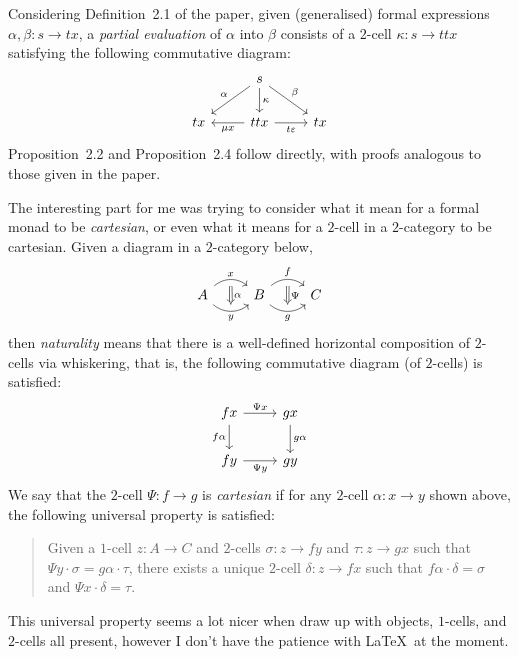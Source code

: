 \documentclass{amsart}
\begin{document}
Considering Definition~2.1 of the paper, given (generalised) formal expressions
$\alpha, \beta \colon s \rightarrow tx$, a \emph{partial evaluation} of
$\alpha$ into $\beta$ consists of a $2$-cell $\kappa \colon s \rightarrow ttx$
satisfying the following commutative diagram:
\begin{equation*}
\begin{tikzcd}
& s
\arrow[ld, "\alpha"']
\arrow[d, "\kappa"]
\arrow[rd, "\beta"]
& \\
tx
& ttx
\arrow[l, "\mu x"]
\arrow[r, "t \varepsilon"']
& tx
\end{tikzcd}
\end{equation*}
Proposition~2.2 and Proposition~2.4 follow directly, with proofs analogous to those
given in the paper.

The interesting part for me was trying to consider what it mean for a formal monad
to be \emph{cartesian}, or even what it means for a $2$-cell in a $2$-category to be
cartesian.
Given a diagram in a $2$-category below,
\begin{equation*}
\begin{tikzcd}
A
\arrow[r, bend left = 40, ""{name=U, below}, "x"]
\arrow[r, bend right = 40, ""{name=D}, "y"']
& B
\arrow[r, bend left = 40, ""{name=U1, below}, "f"]
\arrow[r, bend right = 40, ""{name=D1}, "g"']
& C
\arrow[Rightarrow, from=U, to=D, "\alpha"]
\arrow[Rightarrow, from=U1, to=D1, "\Psi"]
\end{tikzcd}
\end{equation*}
then \emph{naturality} means that there is a well-defined horizontal composition of
$2$-cells via whiskering, that is, the following commutative diagram (of $2$-cells)
is satisfied:
\begin{equation*}
\begin{tikzcd}
fx
\arrow[r, "\Psi x"]
\arrow[d, "f \alpha"']
& gx
\arrow[d, "g \alpha"]
\\
fy
\arrow[r, "\Psi y"']
& gy
\end{tikzcd}
\end{equation*}
We say that the $2$-cell $\Psi \colon f \rightarrow g$ is \emph{cartesian} if
for any $2$-cell $\alpha \colon x \rightarrow y$ shown above, the following
universal property is satisfied:
\begin{quote}
Given a $1$-cell $z \colon A \rightarrow C$ and $2$-cells $\sigma \colon z \rightarrow
fy$ and $\tau \colon z \rightarrow gx$ such that
$\Psi y \cdot \sigma = g \alpha \cdot \tau$,
there exists a unique $2$-cell $\delta \colon z \rightarrow f x$ such that
$ f \alpha \cdot \delta = \sigma$ and $\Psi x \cdot \delta = \tau$.
\end{quote}
This universal property seems a lot nicer when draw up with objects, $1$-cells, and
$2$-cells all present, however I don't have the patience with \LaTeX\ at the moment.
\end{document}

